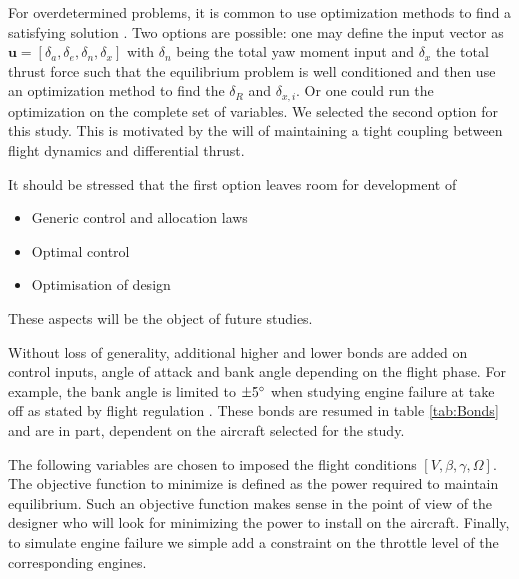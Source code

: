 For overdetermined problems, it is common to use optimization methods to find a satisfying solution \cite{OppeinheimerControlAllocation}. Two options are possible: one may define the input vector as $\mathbf{u}=[\delta_a,\delta_e,\delta_n, \delta_x]$ with $\delta_n$ being the total yaw moment input and $\delta_x$ the total thrust force such that the equilibrium problem is well conditioned and then use an optimization method to find the $\delta_R$ and $\delta_{x,i}$. Or one could run the optimization on the complete set of variables. We selected the second option for this study. This is motivated by the will of maintaining a tight coupling between flight dynamics and differential thrust.

It should be stressed that the first option leaves room for development of 
\begin{itemize}
	\item Generic control and allocation laws
	\item Optimal control
	\item Optimisation of design
\end{itemize}

These aspects will be the object of future studies.

Without loss of generality, additional higher and lower bonds are added on control inputs, angle of attack and bank angle depending on the flight phase. For example, the bank angle is limited to $\pm5\degree$ when studying engine failure at take off as stated by flight regulation \cite{CS25}. These bonds are resumed in table \ref{tab:Bonds} and are in part, dependent on the aircraft selected for the study.

The following variables are chosen to imposed the flight conditions $[V,\beta,\gamma,\Omega]$. The objective function to minimize is defined as the power required to maintain equilibrium. Such an objective function makes sense in the point of view of the designer who will look for minimizing the power to install on the aircraft. Finally, to simulate engine failure we simple add a constraint on the throttle level of the corresponding engines.

